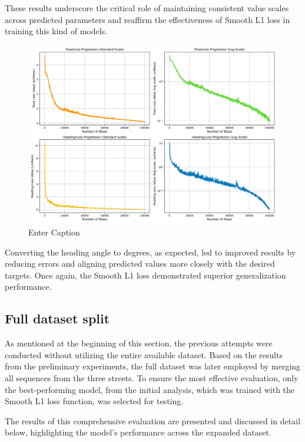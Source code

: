 These results underscore the critical role of maintaining consistent value scales across predicted parameters and reaffirm the effectiveness of Smooth L1 loss in training this kind of models.
\begin{figure}[H]
    \centering
    \includegraphics[width=1\linewidth]{LateX//figs/l1s_111_DEG_pose_heading_loss_comparison.png}
    \caption{Enter Caption}
    \label{fig:enter-label}
\end{figure}

Converting the heading angle to degrees, as expected, led to improved results by reducing errors and aligning predicted values more closely with the desired targets. Once again, the Smooth L1 loss demonstrated superior generalization performance.

\subsection*{Full dataset split}
As mentioned at the beginning of this section, the previous attempts were conducted without utilizing the entire available dataset. Based on the results from the preliminary experiments, the full dataset was later employed by merging all sequences from the three streets. To ensure the most effective evaluation, only the best-performing model, from the initial analysis, which was trained with the Smooth L1 loss function, was selected for testing. 

The results of this comprehensive evaluation are presented and discussed in detail below, highlighting the model's performance across the expanded dataset.



